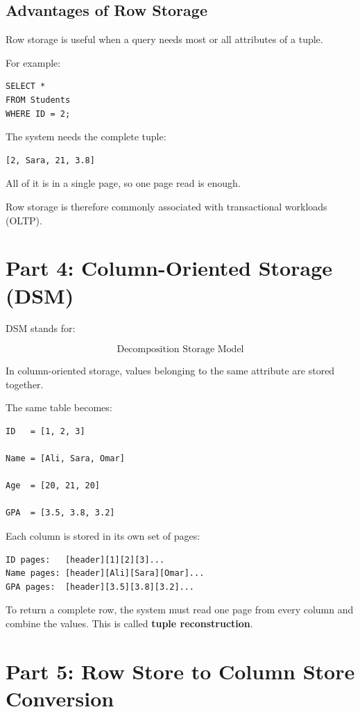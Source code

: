 \documentclass[12pt,a4paper]{article}
\begin{document}
\subsection{Advantages of Row Storage}

Row storage is useful when a query needs most or all attributes of a tuple.

For example:

\begin{verbatim}
SELECT *
FROM Students
WHERE ID = 2;
\end{verbatim}

The system needs the complete tuple:

\begin{verbatim}
[2, Sara, 21, 3.8]
\end{verbatim}

All of it is in a single page, so one page read is enough.

Row storage is therefore commonly associated with transactional workloads (OLTP).

\section{Part 4: Column-Oriented Storage (DSM)}

DSM stands for:

\[
\boxed{\text{Decomposition Storage Model}}
\]

In column-oriented storage, values belonging to the same attribute are stored together.

The same table becomes:

\begin{verbatim}
ID   = [1, 2, 3]

Name = [Ali, Sara, Omar]

Age  = [20, 21, 20]

GPA  = [3.5, 3.8, 3.2]
\end{verbatim}

Each column is stored in its own set of pages:

\begin{verbatim}
ID pages:   [header][1][2][3]...
Name pages: [header][Ali][Sara][Omar]...
GPA pages:  [header][3.5][3.8][3.2]...
\end{verbatim}

To return a complete row, the system must read one page from every column and combine the values. This is called \textbf{tuple reconstruction}.

\section{Part 5: Row Store to Column Store Conversion}
\end{document}
